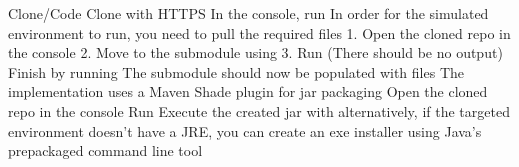 \markdownRendererDocumentBegin
\markdownRendererSectionBegin
\markdownRendererSectionBegin
{}\markdownRendererInterblockSeparator
{}\markdownRendererSectionBegin
{}\markdownRendererInterblockSeparator
{}\markdownRendererOlBeginTight
{}Clone/Code\markdownRendererOlItemEnd 
{}Clone with HTTPS\markdownRendererOlItemEnd 
{}In the console, run \markdownRendererOlItemEnd 
\markdownRendererOlEndTight \markdownRendererInterblockSeparator
{}
\markdownRendererSectionEnd \markdownRendererSectionBegin
{}\markdownRendererInterblockSeparator
{}In order for the simulated environment to run, you need to pull the required files 1. Open the cloned repo in the console 2. Move to the submodule using  3. Run  (There should be no output)\markdownRendererInterblockSeparator
{}\markdownRendererOlBeginTight
{}Finish by running \markdownRendererOlItemEnd 
{}The  submodule should now be populated with  files\markdownRendererOlItemEnd 
\markdownRendererOlEndTight \markdownRendererInterblockSeparator
{}
\markdownRendererSectionEnd 
\markdownRendererSectionEnd \markdownRendererSectionBegin
{}\markdownRendererInterblockSeparator
{}The implementation uses a Maven Shade plugin for jar packaging\markdownRendererInterblockSeparator
{}\markdownRendererOlBeginTight
{}Open the cloned repo in the console\markdownRendererOlItemEnd 
{}Run \markdownRendererOlItemEnd 
{}Execute the created jar with \markdownRendererInterblockSeparator
{}\markdownRendererUlBeginTight
\markdownRendererUlItem alternatively, if the targeted environment doesn't have a JRE, you can create an exe installer using Java's prepackaged  command line tool\markdownRendererUlItemEnd 
